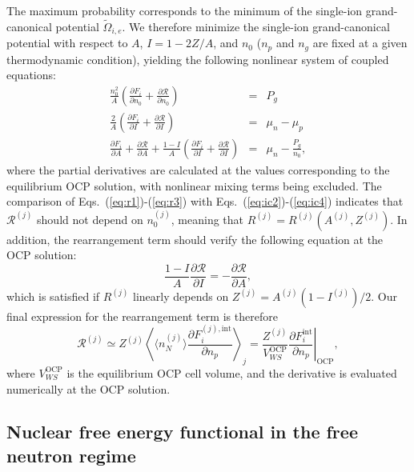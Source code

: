 The maximum probability corresponds to the minimum of the single-ion
grand-canonical potential $\tilde{\Omega}_{i,e}$. We therefore minimize the 
single-ion grand-canonical potential with respect to $A$, $I=1-2Z/A$, and 
$n_0$ ($n_p$ and $n_g$ are fixed at a given thermodynamic condition), yielding 
the following nonlinear system of coupled equations:
%
\begin{eqnarray}
  \frac{n_0^2}{A}\left(\frac{\partial F_i}{\partial n_0} + \frac{\partial
  \mathcal{R}}{\partial n_0}\right) &=& P_g\label{eq:r1}\\
  \frac{2}{A}\left(\frac{\partial F_i}{\partial I} + \frac{\partial
  \mathcal{R}}{\partial I}\right) &=& \mu_n - \mu_p\label{eq:r2}\\
  \frac{\partial F_i}{\partial A} + \frac{\partial \mathcal{R}}{\partial A} +
  \frac{1-I}{A}\left(\frac{\partial F_i}{\partial I} + \frac{\partial
  \mathcal{R}}{\partial I}\right) &=& \mu_n - \frac{P_g}{n_0},\label{eq:r3}
\end{eqnarray}
%
where the partial derivatives are calculated at the values corresponding to 
the equilibrium OCP solution, with nonlinear mixing terms being excluded.
%
The comparison of Eqs.~(\ref{eq:r1})-(\ref{eq:r3}) with
Eqs.~(\ref{eq:ic2})-(\ref{eq:ic4}) indicates that $\mathcal{R}^{(j)}$ should 
not depend on $n_0^{(j)}$, meaning that $R^{(j)}=R^{(j)}(A^{(j)},Z^{(j)})$. In 
addition, the rearrangement term should verify the following equation at the 
OCP solution:
%
\begin{equation}
  \frac{1-I}{A}\frac{\partial \mathcal{R}}{\partial I} = -\frac{\partial
  \mathcal{R}}{\partial A},
\end{equation}
%
which is satisfied if $R^{(j)}$ linearly depends on 
$Z^{(j)} = A^{(j)} (1-I^{(j)})/2$. Our final expression for the rearrangement 
term is therefore
%
\begin{equation}
  \mathcal{R}^{(j)} \simeq Z^{(j)} \left\langle \langle n_N^{(j)}\rangle 
    \frac{\partial F_i^{(j),\text{int}}}{\partial n_p}\right\rangle_j
  = \frac{Z^{(j)}}{V_{WS}^{\text{OCP}}}
  \left.\frac{\partial F_i^{\text{int}}}{\partial
    n_p}\right|_{\text{OCP}},\label{eq:rear}
\end{equation}
%
where $V_{WS}^{\text{OCP}}$ is the equilibrium OCP cell volume, and the
derivative is evaluated numerically at the OCP solution.

\subsection{Nuclear free energy functional in the free neutron 
regime}\label{subsec:freeenfunctional}

